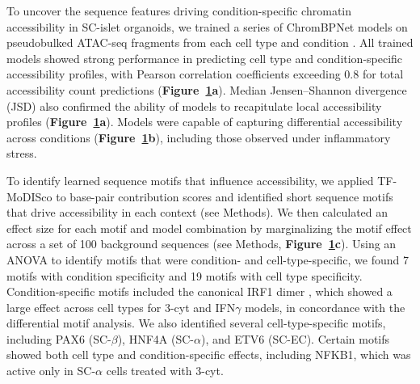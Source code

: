 \begin{figure}[p]
    \label{fig:3 Figure 4}
\end{figure}

To uncover the sequence features driving condition-specific chromatin accessibility in SC-islet organoids, we trained a series of ChromBPNet \cite{Pampari2025-lm} models on pseudobulked ATAC-seq fragments from each cell type and condition \cite{Pampari2025-lm}. All trained models showed strong performance in predicting cell type and condition-specific accessibility profiles, with Pearson correlation coefficients exceeding 0.8 for total accessibility count predictions (\textbf{Figure~\ref{fig:3 Figure 4}\textbf{a}}). Median Jensen–Shannon divergence (JSD) also confirmed the ability of models to recapitulate local accessibility profiles (\textbf{Figure~\ref{fig:3 Figure 4}\textbf{a}}). Models were capable of capturing differential accessibility across conditions (\textbf{Figure~\ref{fig:3 Figure 4}\textbf{b}}), including those observed under inflammatory stress.

To identify learned sequence motifs that influence accessibility, we applied TF-MoDISco \cite{Shrikumar2018-sb} to base-pair contribution scores and identified short sequence motifs that drive accessibility in each context (see Methods). We then calculated an effect size for each motif and model combination by marginalizing the motif effect across a set of 100 background sequences (see Methods, \textbf{Figure~\ref{fig:3 Figure 4}\textbf{c}}). Using an ANOVA to identify motifs that were condition- and cell-type-specific, we found 7 motifs with condition specificity and 19 motifs with cell type specificity. Condition-specific motifs included the canonical IRF1 dimer \cite{Kirchhoff1998-xj}, which showed a large effect across cell types for 3-cyt and IFN$\gamma$ models, in concordance with the differential motif analysis. We also identified several cell-type-specific motifs, including PAX6 (SC-$\beta$), HNF4A (SC-$\alpha$), and ETV6 (SC-EC). Certain motifs showed both cell type and condition-specific effects, including NFKB1, which was active only in SC-$\alpha$ cells treated with 3-cyt. 

